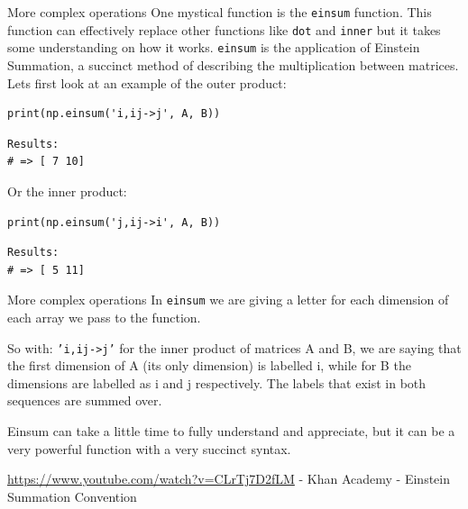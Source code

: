 \documentclass[10pt]{beamer}
\begin{document}
\begin{frame}[label={sec:orgdfb0049},fragile]{More complex operations}
 One mystical function is the \texttt{einsum} function. This function can effectively replace
other functions like \texttt{dot} and \texttt{inner} but it takes some understanding on how it
works. \texttt{einsum} is the application of Einstein Summation, a succinct method of
describing the multiplication between matrices. Lets first look at an example of the outer product:

\begin{verbatim}
print(np.einsum('i,ij->j', A, B))
\end{verbatim}

\begin{verbatim}
Results: 
# => [ 7 10]
\end{verbatim}


Or the inner product:

\begin{verbatim}
print(np.einsum('j,ij->i', A, B))
\end{verbatim}

\begin{verbatim}
Results: 
# => [ 5 11]
\end{verbatim}
\end{frame}

\begin{frame}[label={sec:org0068cfb},fragile]{More complex operations}
 In \texttt{einsum} we are giving a letter for each dimension of each array we pass to the
function.

So with: \texttt{'i,ij->j'} for the inner product of matrices A and B, we are saying that the
first dimension of A (its only dimension) is labelled i, while for B the dimensions
are labelled as i and j respectively. The labels that exist in both sequences are
summed over. 

Einsum can take a little time to fully understand and appreciate, but it can be a
very powerful function with a very succinct syntax.

\url{https://www.youtube.com/watch?v=CLrTj7D2fLM} - Khan Academy - Einstein Summation Convention
\end{frame}
\end{document}
